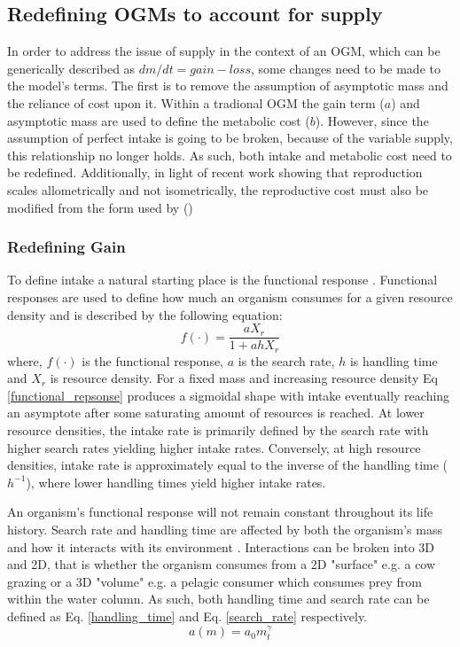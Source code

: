 \documentclass[a4paper, 11pt, hidelinks]{article} %
\begin{document}
	\subsection{Redefining OGMs to account for supply}
	In order to address the issue of supply in the context of an OGM, which can be generically described as $dm/dt = gain - loss$, some changes need to be made to the model's terms.  The first is to remove the assumption of asymptotic mass and the reliance of cost upon it.  Within a tradional OGM the gain term ($ a $) and asymptotic mass are used to define the metabolic cost ($ b $).  However, since the assumption of perfect intake is going to be broken, because of the variable supply, this relationship no longer holds.  As such, both intake and metabolic cost need to be redefined.  Additionally, in light of recent work showing that reproduction scales allometrically and not isometrically, the reproductive cost must also be modified from the form used by \citeauthor{Charnov2001} (\citeyear{Charnov2001}) \parencite{Marshall2019, Barneche2018} %
	
	
	\subsubsection{Redefining Gain}
	To define intake a natural starting place is the functional response \parencite{Holling1959}.  Functional responses  are used to define how much an organism consumes for a given resource density and is described by the following equation:	
	\begin{equation}
		\label{functional_repsonse}
		f(\cdot) = \frac{a X_r}{1 + a h X_r}
	\end{equation}
	where, $ f(\cdot) $ is the functional response, $ a $ is the search rate, $ h $ is handling time and $ X_r $ is resource density.  
	For a fixed mass and increasing resource density Eq \ref{functional_repsonse} produces a sigmoidal shape with intake eventually reaching an asymptote after some saturating amount of resources is reached.  At lower resource densities, the intake rate is primarily defined by the search rate with higher search rates yielding higher intake rates.  Conversely, at high resource densities, intake rate is approximately equal to the inverse of the handling time ($ h^{-1} $), where lower handling times yield higher intake rates.  
	
	An organism's functional response will not remain constant throughout its life history.  Search rate and handling time are affected by both the organism's mass and how it interacts with its environment \parencite{Pawar2012}.  
	Interactions can be broken into 3D and 2D, that is whether the organism consumes from a 2D "surface" e.g. a cow grazing or a 3D "volume" e.g. a pelagic consumer which consumes prey from within the water column.  As such, both handling time and search rate can be defined as Eq. \ref{handling_time} and Eq. \ref{search_rate} respectively.
	\begin{equation}
		\label{search_rate}
		a(m) = a_0 m_t^\gamma
	\end{equation}
	
\end{document}
